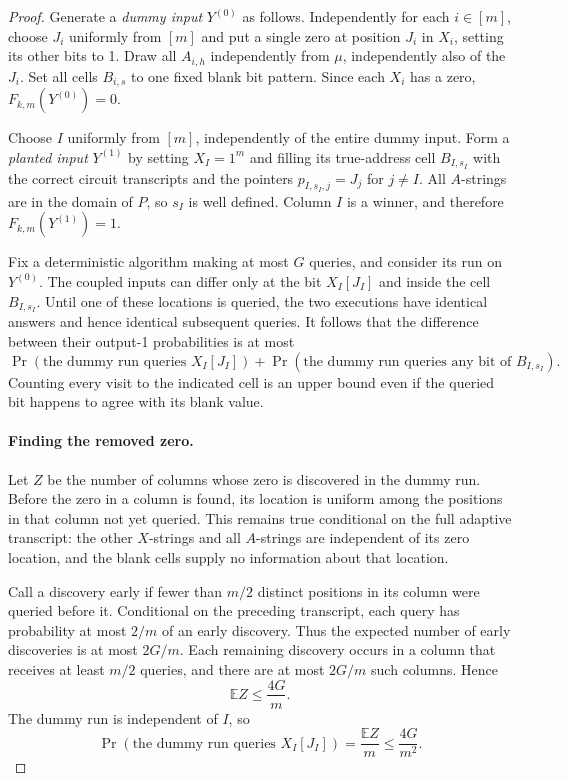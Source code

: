 \documentclass[11pt]{article}
\theoremstyle{definition}
\begin{document}
\begin{proof}
Generate a \emph{dummy input} $Y^{(0)}$ as follows.  Independently for
each $i\in[m]$, choose $J_i$ uniformly from $[m]$ and put a single zero
at position $J_i$ in $X_i$, setting its other bits to 1.  Draw all
$A_{i,h}$ independently from $\mu$, independently also of the $J_i$.
Set all cells $B_{i,s}$ to one fixed blank bit pattern.  Since each $X_i$
has a zero, $F_{k,m}(Y^{(0)})=0$.

Choose $I$ uniformly from $[m]$, independently of the entire dummy
input.  Form a \emph{planted input} $Y^{(1)}$ by setting $X_I=1^m$ and
filling its true-address cell $B_{I,s_I}$ with the correct circuit
transcripts and the pointers $p_{I,s_I,j}=J_j$ for $j\ne I$.
All $A$-strings are in the domain of $P$, so $s_I$ is well defined.
Column $I$ is a winner, and therefore $F_{k,m}(Y^{(1)})=1$.

Fix a deterministic algorithm making at most $G$ queries, and consider
its run on $Y^{(0)}$.  The coupled inputs can differ only at the bit
$X_I[J_I]$ and inside the cell $B_{I,s_I}$.  Until one of these locations
is queried, the two executions have identical answers and hence
identical subsequent queries.  It follows that the difference between
their output-1 probabilities is at most
\begin{equation}\label{eq:coupling-events}
 \Pr(\text{the dummy run queries }X_I[J_I])
 +\Pr(\text{the dummy run queries any bit of }B_{I,s_I}).
\end{equation}
Counting every visit to the indicated cell is an upper bound even if
the queried bit happens to agree with its blank value.

\paragraph{Finding the removed zero.}
Let $Z$ be the number of columns whose zero is discovered in the dummy
run.  Before the zero in a column is found, its location is uniform
among the positions in that column not yet queried.  This remains true
conditional on the full adaptive transcript: the other $X$-strings and
all $A$-strings are independent of its zero location, and the blank
cells supply no information about that location.

Call a discovery early if fewer than $m/2$ distinct positions in its
column were queried before it.  Conditional on the preceding transcript,
each query has probability at most $2/m$ of an early discovery.  Thus
the expected number of early discoveries is at most $2G/m$.  Each
remaining discovery occurs in a column that receives at least $m/2$
queries, and there are at most $2G/m$ such columns.  Hence
\[
 \mathbb E Z\leq\frac{4G}{m}.
\]
The dummy run is independent of $I$, so
\begin{equation}\label{eq:zero-hit}
 \Pr(\text{the dummy run queries }X_I[J_I])
 =\frac{\mathbb E Z}{m}\leq\frac{4G}{m^2}.
\end{equation}


\end{proof}
\end{document}
